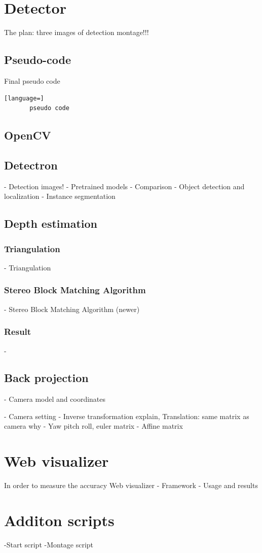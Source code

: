 \section{Detector}
    The plan: 
    three images of detection montage!!!
    \subsection{Pseudo-code}
    Final pseudo code
    \begin{lstlisting}[language=]
       pseudo code
    \end{lstlisting}
    \subsection{OpenCV}
    \subsection{Detectron}
    - Detection images!
    - Pretrained models
    - Comparison
    - Object detection and localization
    - Instance segmentation
    \subsection{Depth estimation}
    \subsubsection{Triangulation}
        - Triangulation
    \subsubsection{Stereo Block Matching Algorithm}
    - Stereo Block Matching Algorithm (newer)
    \subsubsection{Result}
    - 
    \subsection{Back projection}
    - Camera model and coordinates

    - Camera setting
    - Inverse transformation explain, Translation: same matrix as camera why
    - Yaw pitch roll, euler matrix
    - Affine matrix

\section{Web visualizer}
In order to measure the accuracy
        Web visualizer
    -  Framework
    -  Usage and results

\section{Additon scripts}
-Start script
-Montage script

